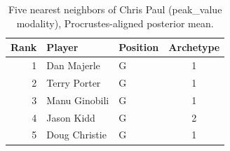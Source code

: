 \begin{table}[htbp]
  \centering\small
  \begin{tabular}{rllc}
    \toprule
    Rank & Player & Position & Archetype \\
    \midrule
    1 & Dan Majerle & G & 1 \\
    2 & Terry Porter & G & 1 \\
    3 & Manu Ginobili & G & 1 \\
    4 & Jason Kidd & G & 2 \\
    5 & Doug Christie & G & 1 \\
    \bottomrule
  \end{tabular}
  \caption{Five nearest neighbors of Chris Paul (peak_value modality), Procrustes-aligned posterior mean.}
  \label{tab:Chris_Paul_neighbors_peak_value}
\end{table}


